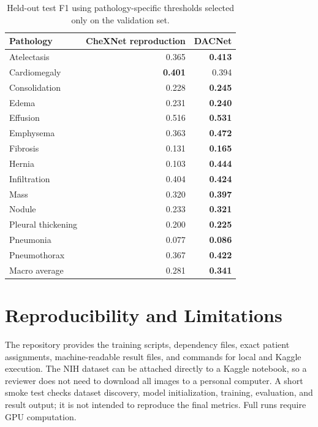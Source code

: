 \begin{table}[ht]
\centering
\small
\begin{tabular}{lrr}
\hline
\textbf{Pathology} & \textbf{CheXNet reproduction} & \textbf{DACNet} \\
\hline
Atelectasis        & 0.365 & \textbf{0.413} \\
Cardiomegaly       & \textbf{0.401} & 0.394 \\
Consolidation      & 0.228 & \textbf{0.245} \\
Edema              & 0.231 & \textbf{0.240} \\
Effusion           & 0.516 & \textbf{0.531} \\
Emphysema          & 0.363 & \textbf{0.472} \\
Fibrosis           & 0.131 & \textbf{0.165} \\
Hernia             & 0.103 & \textbf{0.444} \\
Infiltration       & 0.404 & \textbf{0.424} \\
Mass               & 0.320 & \textbf{0.397} \\
Nodule             & 0.233 & \textbf{0.321} \\
Pleural thickening & 0.200 & \textbf{0.225} \\
Pneumonia          & 0.077 & \textbf{0.086} \\
Pneumothorax       & 0.367 & \textbf{0.422} \\
\hline
Macro average      & 0.281 & \textbf{0.341} \\
\hline
\end{tabular}
\caption{Held-out test F1 using pathology-specific thresholds selected only on
the validation set.}
\label{tab:f1_by_disease}
\end{table}

\section{Reproducibility and Limitations}

The repository provides the training scripts, dependency files, exact patient
assignments, machine-readable result files, and commands for local and Kaggle
execution. The NIH dataset can be attached directly to a Kaggle notebook, so a
reviewer does not need to download all images to a personal computer. A short
smoke test checks dataset discovery, model initialization, training,
evaluation, and result output; it is not intended to reproduce the final
metrics. Full runs require GPU computation.

